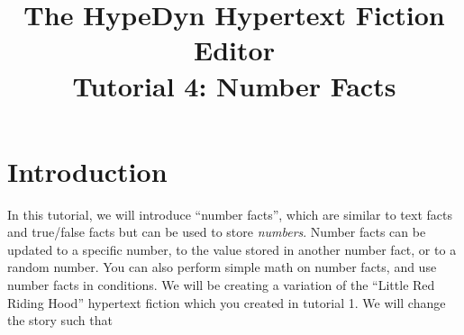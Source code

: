\documentclass{article}
\begin{document}
\title{The HypeDyn Hypertext Fiction Editor\\Tutorial 4: Number Facts}
\date{}

\onecolumn
\maketitle

\tableofcontents

\section{Introduction}
In this tutorial, we will introduce ``number facts'', which are similar to text
facts and true\slash false facts but can be used to store \textit{numbers}.
Number facts can be updated to a specific number, to the value stored in another
number fact, or to a random number. You can also perform simple math on number
facts, and use number facts in conditions. We will be creating a variation of
the ``Little Red Riding Hood'' hypertext fiction which you created in tutorial
1. We will change the story such that


% 
\end{document}
